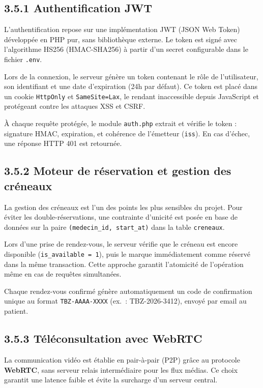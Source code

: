 \documentclass[12pt,a4paper]{report}
\begin{document}
\subsection*{3.5.1 Authentification JWT}

L'authentification repose sur une impl\'ementation JWT (JSON Web Token) d\'evelopp\'ee en PHP pur, sans biblioth\`eque externe. Le token est sign\'e avec l'algorithme HS256 (HMAC-SHA256) \`a partir d'un secret configurable dans le fichier \texttt{.env}.

Lors de la connexion, le serveur g\'en\`ere un token contenant le r\^ole de l'utilisateur, son identifiant et une date d'expiration (24h par d\'efaut). Ce token est plac\'e dans un cookie \texttt{HttpOnly} et \texttt{SameSite=Lax}, le rendant inaccessible depuis JavaScript et prot\'egeant contre les attaques XSS et CSRF.

\`A chaque requ\^ete prot\'eg\'ee, le module \texttt{auth.php} extrait et v\'erifie le token : signature HMAC, expiration, et coh\'erence de l'\'emetteur (\texttt{iss}). En cas d'\'echec, une r\'eponse HTTP 401 est retourn\'ee.

\subsection*{3.5.2 Moteur de r\'eservation et gestion des cr\'eneaux}

La gestion des cr\'eneaux est l'un des points les plus sensibles du projet. Pour \'eviter les double-r\'eservations, une contrainte d'unicit\'e est pos\'ee en base de donn\'ees sur la paire \texttt{(medecin\_id, start\_at)} dans la table \texttt{creneaux}.

Lors d'une prise de rendez-vous, le serveur v\'erifie que le cr\'eneau est encore disponible (\texttt{is\_available = 1}), puis le marque imm\'ediatement comme r\'eserv\'e dans la m\^eme transaction. Cette approche garantit l'atomicit\'e de l'op\'eration m\^eme en cas de requ\^etes simultan\'ees.

Chaque rendez-vous confirm\'e g\'en\`ere automatiquement un code de confirmation unique au format \texttt{TBZ-AAAA-XXXX} (ex.~: TBZ-2026-3412), envoy\'e par email au patient.

\subsection*{3.5.3 T\'el\'econsultation avec WebRTC}

La communication vid\'eo est \'etablie en pair-\`a-pair (P2P) gr\^ace au protocole \textbf{WebRTC}, sans serveur relais interm\'ediaire pour les flux m\'edias. Ce choix garantit une latence faible et \'evite la surcharge d'un serveur central.
\end{document}
